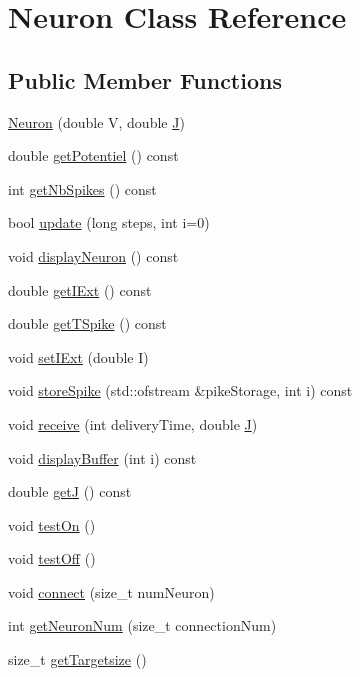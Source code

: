 \hypertarget{classNeuron}{\section{Neuron Class Reference}
\label{classNeuron}
}
\subsection*{Public Member Functions}
\begin{DoxyCompactItemize}
\item 
\hyperlink{classNeuron_ae88565006def2c1e36d6ff5c2c7a274c}{Neuron} (double V, double \hyperlink{classNeuron_a6e18453cc704aac89fef1cc3e69ac20c}{J})
\item 
double \hyperlink{classNeuron_ac1eee18fc2e8bb6b5f39f727443e6930}{get\-Potentiel} () const 
\item 
int \hyperlink{classNeuron_ab1efa405eb0cd7bac6ca012c961efe5d}{get\-Nb\-Spikes} () const 
\item 
bool \hyperlink{classNeuron_acab9fb2615007293300080208b40d5f8}{update} (long steps, int i=0)
\item 
void \hyperlink{classNeuron_a3953cbc7a936c974bb93a1507dc107a3}{display\-Neuron} () const 
\item 
double \hyperlink{classNeuron_a3c05aa14cfa57146a609cf59d6729a28}{get\-I\-Ext} () const 
\item 
double \hyperlink{classNeuron_a55f54b1fde03380d1961df168681b40f}{get\-T\-Spike} () const 
\item 
void \hyperlink{classNeuron_afedfd126ca5fb3c3371f0c81521110c1}{set\-I\-Ext} (double I)
\item 
void \hyperlink{classNeuron_a242fda806f234c192576c34907140c27}{store\-Spike} (std\-::ofstream \&pike\-Storage, int i) const 
\item 
void \hyperlink{classNeuron_af0fcacf106c3cf9d02cd1b3a19e78459}{receive} (int delivery\-Time, double \hyperlink{classNeuron_a6e18453cc704aac89fef1cc3e69ac20c}{J})
\item 
void \hyperlink{classNeuron_a0782ae55ba365478ecb4844a85d1f7fc}{display\-Buffer} (int i) const 
\item 
double \hyperlink{classNeuron_a320ab48e220523371b266385c650e31f}{get\-J} () const 
\item 
void \hyperlink{classNeuron_a2f26d1bc3d172c2e5319541dc64d1979}{test\-On} ()
\item 
void \hyperlink{classNeuron_a4063d72fda40dd39153fc871435b9d6a}{test\-Off} ()
\item 
void \hyperlink{classNeuron_a894c1589ac89df363631f03c5999236a}{connect} (size\-\_\-t num\-Neuron)
\item 
int \hyperlink{classNeuron_a044cf97c24a6f465e855df50ef13d89e}{get\-Neuron\-Num} (size\-\_\-t connection\-Num)
\item 
size\-\_\-t \hyperlink{classNeuron_af519d734d92414ae4af2b1c205c896ae}{get\-Targetsize} ()
\end{DoxyCompactItemize}
